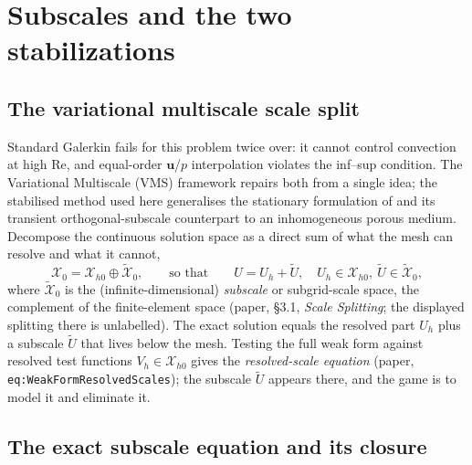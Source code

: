 \documentclass[11pt]{article}
\newcommand{\Reyn}{\mathrm{Re}}
\newcommand{\bu}{\boldsymbol{u}}
\newcommand{\Xzero}{\mathcal{X}_{0}}
\newcommand{\Xhz}{\mathcal{X}_{h0}}
\newcommand{\Xtil}{\widetilde{\mathcal{X}}}
\newcommand{\Uh}{U_{h}}
\newcommand{\Util}{\widetilde{U}}
\theoremstyle{plain}
\theoremstyle{definition}
\theoremstyle{remark}
\begin{document}
\section{Subscales and the two stabilizations}\label{sec:vms}

\subsection{The variational multiscale scale split}

Standard Galerkin fails for this problem twice over: it cannot control
convection at high $\Reyn$, and equal-order $\bu$/$p$ interpolation
violates the inf--sup condition. The Variational Multiscale (VMS)
framework \cite{codina2018} repairs both from a single idea; the
stabilised method used here generalises the stationary formulation of
\cite{codina2001} and its transient orthogonal-subscale counterpart
\cite{codina2002} to an inhomogeneous porous medium. Decompose the
continuous solution space as a direct sum of what the mesh can resolve
and what it cannot,
%
\begin{equation}\label{eq:split}
  \Xzero=\Xhz\oplus\Xtil_0,
  \qquad\text{so that}\qquad
  U=\Uh+\Util,\quad \Uh\in\Xhz,\ \Util\in\Xtil_0,
\end{equation}
%
where $\Xtil_0$ is the (infinite-dimensional) \emph{subscale} or
subgrid-scale space, the complement of the finite-element space (paper,
\S3.1, \emph{Scale Splitting}; the displayed splitting there is
unlabelled). The exact solution equals the
resolved part $\Uh$ plus a subscale $\Util$ that lives below the mesh.
Testing the full weak form against resolved test functions
$V_h\in\Xhz$ gives the \emph{resolved-scale equation} (paper,
\texttt{eq:WeakFormResolvedScales}); the subscale $\Util$ appears there,
and the game is to model it and eliminate it.

\subsection{The exact subscale equation and its closure}
\end{document}
